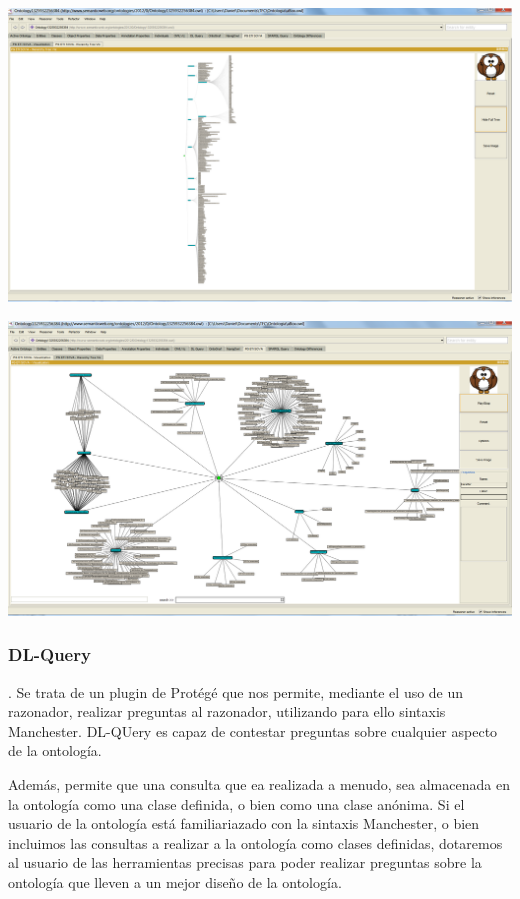 \begin{center}
		\includegraphics[width=1.00\textwidth]{Imagenes/Herramientas-SOVAhie.png}
\end{center}
\begin{center}
		\includegraphics[width=1.00\textwidth]{Imagenes/Herramientas-SOVAvis.png}
\end{center}


\subsubsection{DL-Query}. Se trata de un plugin de Protégé que nos permite, mediante el uso de un razonador, realizar preguntas al razonador, utilizando para ello sintaxis Manchester. DL-QUery es capaz de contestar preguntas sobre cualquier aspecto de la ontología. 

Además, permite que una consulta que ea realizada a menudo, sea almacenada en la ontología como una clase definida, o bien como una clase anónima. Si el usuario de la ontología está familiariazado con la sintaxis Manchester, o bien incluimos las consultas a realizar a la ontología como clases definidas, dotaremos al usuario de las herramientas precisas para poder realizar preguntas sobre la ontología que lleven a un mejor diseño de la ontología.


